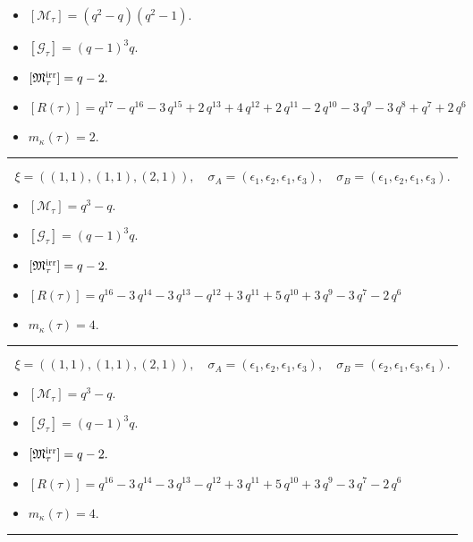\documentclass[10pt,a4paper]{amsart}
\begin{document}
\begin{itemize}
 \item $[\mathcal{M}_{\tau}] = {\left(q^{2} - q\right)} {\left(q^{2} - 1\right)} .$

 \item $[\mathcal{G}_{\tau}] = {\left(q - 1\right)}^{3} q .$

 \item $[{\frak M}_{\tau}^{\textrm{irr}}] = q - 2 .$

 \item $[R(\tau)] = q^{17} - q^{16} - 3 \, q^{15} + 2 \, q^{13} + 4 \, q^{12} + 2 \, q^{11} - 2 \, q^{10} - 3 \, q^{9} - 3 \, q^{8} + q^{7} + 2 \, q^{6} $

 \item $m_{\kappa}(\tau) = 2 .$

 \end{itemize}
\noindent\rule{8cm}{0.4pt}

$$\xi = ({(1, 1), (1, 1)}, {(2, 1)}),\quad \sigma_A = ({{\epsilon_1}, {\epsilon_2}}, {{\epsilon_1, \epsilon_3}}),\quad \sigma_B = ({{\epsilon_1}, {\epsilon_2}}, {{\epsilon_1, \epsilon_3}}).$$

\begin{itemize}
 \item $[\mathcal{M}_{\tau}] = q^{3} - q .$

 \item $[\mathcal{G}_{\tau}] = {\left(q - 1\right)}^{3} q .$

 \item $[{\frak M}_{\tau}^{\textrm{irr}}] = q - 2 .$

 \item $[R(\tau)] = q^{16} - 3 \, q^{14} - 3 \, q^{13} - q^{12} + 3 \, q^{11} + 5 \, q^{10} + 3 \, q^{9} - 3 \, q^{7} - 2 \, q^{6} $

 \item $m_{\kappa}(\tau) = 4 .$

 \end{itemize}
\noindent\rule{8cm}{0.4pt}

$$\xi = ({(1, 1), (1, 1)}, {(2, 1)}),\quad \sigma_A = ({{\epsilon_1}, {\epsilon_2}}, {{\epsilon_1, \epsilon_3}}),\quad \sigma_B = ({{\epsilon_2}, {\epsilon_1}}, {{\epsilon_3, \epsilon_1}}).$$

\begin{itemize}
 \item $[\mathcal{M}_{\tau}] = q^{3} - q .$

 \item $[\mathcal{G}_{\tau}] = {\left(q - 1\right)}^{3} q .$

 \item $[{\frak M}_{\tau}^{\textrm{irr}}] = q - 2 .$

 \item $[R(\tau)] = q^{16} - 3 \, q^{14} - 3 \, q^{13} - q^{12} + 3 \, q^{11} + 5 \, q^{10} + 3 \, q^{9} - 3 \, q^{7} - 2 \, q^{6} $

 \item $m_{\kappa}(\tau) = 4 .$

 \end{itemize}
\noindent\rule{8cm}{0.4pt}
\end{document}
